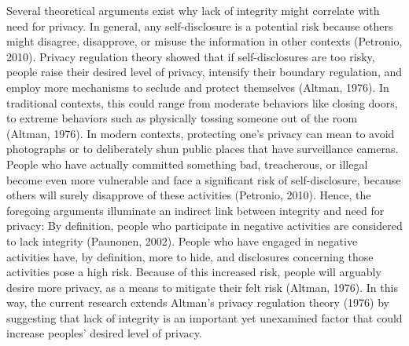 \documentclass[man,floatsintext]{apa6}
\theoremstyle{definition}
\theoremstyle{definition}
\theoremstyle{definition}
\theoremstyle{remark}
\begin{document}
Several theoretical arguments exist why lack of integrity might
correlate with need for privacy. In general, any self-disclosure is a
potential risk because others might disagree, disapprove, or misuse the
information in other contexts (Petronio, 2010). Privacy regulation
theory showed that if self-disclosures are too risky, people raise their
desired level of privacy, intensify their boundary regulation, and
employ more mechanisms to seclude and protect themselves (Altman, 1976).
In traditional contexts, this could range from moderate behaviors like
closing doors, to extreme behaviors such as physically tossing someone
out of the room (Altman, 1976). In modern contexts, protecting one's
privacy can mean to avoid photographs or to deliberately shun public
places that have surveillance cameras. People who have actually
committed something bad, treacherous, or illegal become even more
vulnerable and face a significant risk of self-disclosure, because
others will surely disapprove of these activities (Petronio, 2010).
Hence, the foregoing arguments illuminate an indirect link between
integrity and need for privacy: By definition, people who participate in
negative activities are considered to lack integrity (Paunonen, 2002).
People who have engaged in negative activities have, by definition, more
to hide, and disclosures concerning those activities pose a high risk.
Because of this increased risk, people will arguably desire more
privacy, as a means to mitigate their felt risk (Altman, 1976). In this
way, the current research extends Altman's privacy regulation theory
(1976) by suggesting that lack of integrity is an important yet
unexamined factor that could increase peoples' desired level of privacy.
\end{document}
